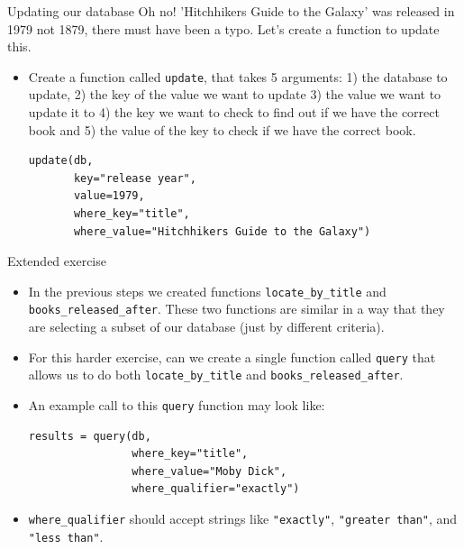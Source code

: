 \documentclass[10pt]{beamer}
\begin{document}
\begin{frame}[label={sec:org22fa4e9},fragile]{Updating our database}
 Oh no! 'Hitchhikers Guide to the Galaxy' was released in 1979 not 1879, there must
have been a typo. Let's create a function to update this.

\begin{itemize}
\item Create a function called \texttt{update}, that takes 5 arguments: 1) the database to
update, 2) the key of the value we want to update 3) the value we want to update it
to 4) the key we want to check to find out if we have the correct book and 5) the
value of the key to check if we have the correct book.

\begin{verbatim}
update(db,
       key="release year",
       value=1979,
       where_key="title",
       where_value="Hitchhikers Guide to the Galaxy")
\end{verbatim}
\end{itemize}
\end{frame}

\begin{frame}[label={sec:orge94f3ca},fragile]{Extended exercise}
 \begin{itemize}
\item In the previous steps we created functions \texttt{locate\_by\_title} and
\texttt{books\_released\_after}. These two functions are similar in a way that they are
selecting a subset of our database (just by different criteria).
\item For this harder exercise, can we create a single function called \texttt{query} that allows
us to do both \texttt{locate\_by\_title} and \texttt{books\_released\_after}.
\item An example call to this \texttt{query} function may look like:

\begin{verbatim}
results = query(db,
                where_key="title",
                where_value="Moby Dick",
                where_qualifier="exactly")
\end{verbatim}

\item \texttt{where\_qualifier} should accept strings like \texttt{"exactly"}, \texttt{"greater than"}, and \texttt{"less
  than"}.
\end{itemize}
\end{frame}
\end{document}
